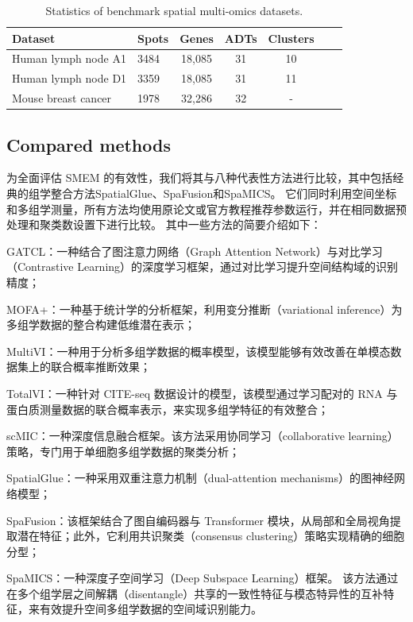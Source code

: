 \documentclass[journal]{IEEEtran}
\begin{document}
\begin{table}[htbp]
\centering
\footnotesize
\caption{Statistics of benchmark spatial multi-omics datasets.}
\label{tab:datasets}
\begin{tabularx}{\columnwidth}{l l c c c l X}
\toprule
Dataset  & Spots & Genes & ADTs  & Clusters \\
\midrule
Human lymph node A1  & 3484 & 18,085 & 31  & 10 \\
Human lymph node D1  & 3359 & 18,085 & 31  & 11 \\
Mouse breast cancer  & 1978 & 32,286 & 32  & - \\
\bottomrule
\end{tabularx}
\end{table}


\subsection{Compared methods}
为全面评估 SMEM 的有效性，我们将其与八种代表性方法进行比较，其中包括经典的组学整合方法SpatialGlue、SpaFusion和SpaMICS。
它们同时利用空间坐标和多组学测量，所有方法均使用原论文或官方教程推荐参数运行，并在相同数据预处理和聚类数设置下进行比较。
其中一些方法的简要介绍如下：

GATCL：一种结合了图注意力网络（Graph Attention Network）与对比学习（Contrastive Learning）的深度学习框架，通过对比学习提升空间结构域的识别精度；

MOFA+：一种基于统计学的分析框架，利用变分推断（variational inference）为多组学数据的整合构建低维潜在表示；

MultiVI：一种用于分析多组学数据的概率模型，该模型能够有效改善在单模态数据集上的联合概率推断效果；

TotalVI：一种针对 CITE-seq 数据设计的模型，该模型通过学习配对的 RNA 与蛋白质测量数据的联合概率表示，来实现多组学特征的有效整合；

scMIC：一种深度信息融合框架。该方法采用协同学习（collaborative learning）策略，专门用于单细胞多组学数据的聚类分析；

SpatialGlue：一种采用双重注意力机制（dual-attention mechanisms）的图神经网络模型；

SpaFusion：该框架结合了图自编码器与 Transformer 模块，从局部和全局视角提取潜在特征；此外，它利用共识聚类（consensus clustering）策略实现精确的细胞分型；

SpaMICS：一种深度子空间学习（Deep Subspace Learning）框架。
该方法通过在多个组学层之间解耦（disentangle）共享的一致性特征与模态特异性的互补特征，来有效提升空间多组学数据的空间域识别能力。
\end{document}
